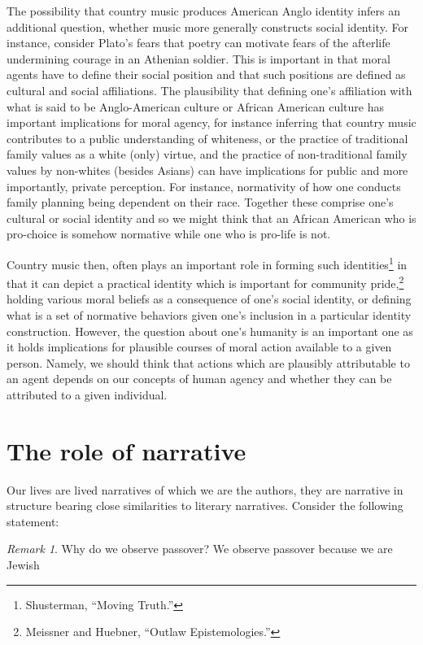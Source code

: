 \documentclass[phdthesis,12pt,final]{wuthesis}
\theoremstyle{definition}
\theoremstyle{definition}
\theoremstyle{definition}
\theoremstyle{definition}
\theoremstyle{remark}
\newtheorem*{remark}{Remark}
\begin{document}
The possibility that country music produces American Anglo identity infers an additional question, whether music more generally constructs social identity. For instance, consider Plato's fears that poetry can motivate fears of the afterlife undermining courage in an Athenian soldier. This is important in that moral agents have to define their social position and that such positions are defined as cultural and social affiliations. The plausibility that defining one's affiliation with what is said to be Anglo-American culture or African American culture has important implications for moral agency, for instance inferring that country music contributes to a public understanding of whiteness, or the practice of traditional family values as a white (only) virtue, and the practice of non-traditional family values by non-whites (besides Asians) can have implications for public and more importantly, private perception. For instance, normativity of how one conducts family planning being dependent on their race. Together these comprise one's cultural or social identity and so we might think that an African American who is pro-choice is somehow normative while one who is pro-life is not.

Country music then, often plays an important role in forming such identities\footnote{Shusterman, {``Moving {Truth}.''}} in that it can depict a practical identity which is important for community pride,\footnote{Meissner and Huebner, {``Outlaw Epistemologies.''}} holding various moral beliefs as a consequence of one's social identity, or defining what is a set of normative behaviors given one's inclusion in a particular identity construction. However, the question about one's humanity is an important one as it holds implications for plausible courses of moral action available to a given person. Namely, we should think that actions which are plausibly attributable to an agent depends on our concepts of human agency and whether they can be attributed to a given individual.

\section{The role of narrative}\label{the-role-of-narrative}

Our lives are lived narratives of which we are the authors, they are narrative in structure bearing close similarities to literary narratives. Consider the following statement:

\begin{remark}
Why do we observe passover? We observe passover because we are Jewish
\end{remark}
\end{document}
